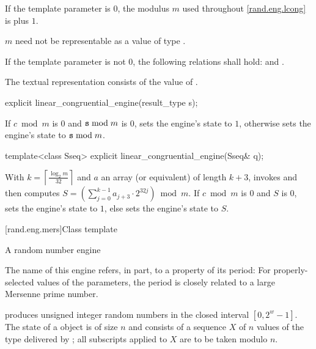 \pnum
If the template parameter
 is $0$,
the modulus $m$
used throughout \ref{rand.eng.lcong}
is  plus $1$.
\begin{note}
 $m$ need not be representable
 as a value of type .
\end{note}

\pnum
If the template parameter
 is not $0$,
the following relations shall hold:
and
  .

\pnum
The textual representation
consists of
the value of .

%
\begin{itemdecl}
explicit linear_congruential_engine(result_type s);
\end{itemdecl}

\begin{itemdescr}
\pnum
\effects
 If $c \bmod m$ is $0$ and $\texttt{\protect s} \bmod m$ is $0$,
 sets the engine's state to $1$,
 otherwise sets the engine's state to $\texttt{\protect s} \bmod m$.
\end{itemdescr}

%
\begin{itemdecl}
template<class Sseq> explicit linear_congruential_engine(Sseq& q);
\end{itemdecl}

\begin{itemdescr}
\pnum
\effects
 With
 $k = \left\lceil \frac{\log_2 m}{32} \right\rceil$
 and $a$ an array (or equivalent)
 of length $k + 3$,
 invokes 
 and then computes
 $S = \left(\sum_{j = 0}^{k - 1} a_{j + 3} \cdot 2^{32j} \right) \bmod m$.
 If $c \bmod m$ is $0$ and $S$ is $0$,
 sets the engine's state to $1$,
 else sets the engine's state
 to $S$.
\end{itemdescr}


[rand.eng.mers]{Class template }%
%

\pnum
A  random number
engine
\begin{footnote}
The name of this engine refers, in part, to a property of its period:
 For properly-selected values of the parameters,
 the period is closely related to a large Mersenne prime number.
\end{footnote}
produces unsigned integer random numbers
in the closed interval $[0,2^w-1]$.
The
state
of a  object 
is of size $n$
and consists of a sequence $X$
of $n$ values of the type delivered by ;
all subscripts applied to $X$ are to be taken modulo $n$.

